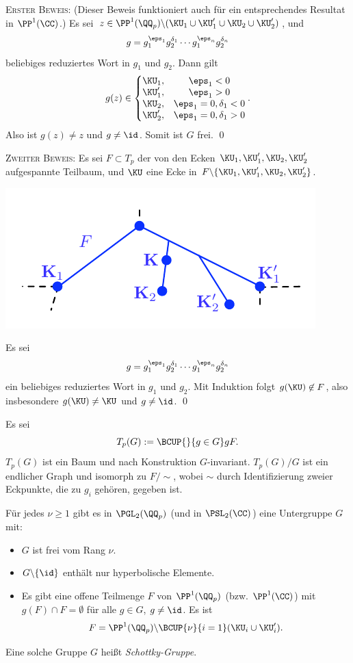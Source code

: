 \textsc{Erster Beweis:}
(Dieser Beweis funktioniert auch für ein entsprechendes
Resultat in $\PP^1(\CC)$.)
Es sei
$z\in\PP^1(\QQ_p)\backslash(\KU_1\cup\KU_1'\cup\KU_2\cup\KU_2')$,
und
\[
g = g_1^{\eps_1} g_2^{\delta_1} \cdots g_1^{\eps_n} g_2^{\delta_n}
\]
beliebiges reduziertes Wort in $g_1$ und $g_2$.
Dann gilt
\[
g(z) \in
\left\{
\begin{matrix}
\KU_1, & \eps_1<0 \\
\KU_1', &\eps_1>0 \\
\KU_2, &\eps_1=0,\delta_1<0\\
\KU_2', &\eps_1=0,\delta_1>0
\end{matrix}
\right..
\]
Also ist $g(z)\neq z$ und $g\neq\id$. Somit ist $G$ frei.
\qed

\textsc{Zweiter Beweis:} Es sei $F\subset T_p$ der von den Ecken
$\KU_1,\KU_1',\KU_2,\KU_2'$ aufgespannte Teilbaum, und
$\KU$ eine Ecke in $F\backslash\{\KU_1,\KU_1',\KU_2,\KU_2'\}$.
\begin{center}
	\includegraphics{grugraImages/ihara2}
\end{center}
Es sei
\[
g = g_1^{\eps_1} g_2^{\delta_1} \cdots g_1^{\eps_n} g_2^{\delta_n}
\]
ein beliebiges reduziertes Wort in $g_1$ und $g_2$.
Mit Induktion folgt $g(\KU)\not\in F$, also insbesondere
$g(\KU)\neq\KU$ und $g\neq \id$.
\qed

\BEM Es sei
\[
T_p(G):=\BCUP{}{g\in G} g F.
\]
$T_p(G)$ ist ein Baum und nach Konstruktion $G$-invariant.
$T_p(G)/G$ ist ein endlicher Graph und isomorph zu $F/\sim$, wobei
$\sim$ durch Identifizierung zweier Eckpunkte, die zu $g_i$ gehören,
gegeben ist.

\BEM Für jedes $\nu\geq 1$ gibt es in $\PGL_2(\QQ_p)$ (und in
$\PSL_2(\CC)$) eine Untergruppe $G$ mit:
\begin{itemize}
\item $G$ ist frei vom Rang $\nu$.
\item $G\backslash\{\id\}$ enthält nur hyperbolische Elemente.
\item Es gibt eine offene Teilmenge $F$ von $\PP^1(\QQ_p)$ (bzw.
$\PP^1(\CC)$) mit $g(F)\cap F=\emptyset$ für alle $g\in G$,
$g\neq\id$. Es ist
\[
F=\PP^1(\QQ_p)\backslash\BCUP{\nu}{i=1}(\KU_i\cup\KU_i').
\]
\end{itemize}
Eine solche Gruppe $G$ heißt \emph{Schottky-Gruppe}.
